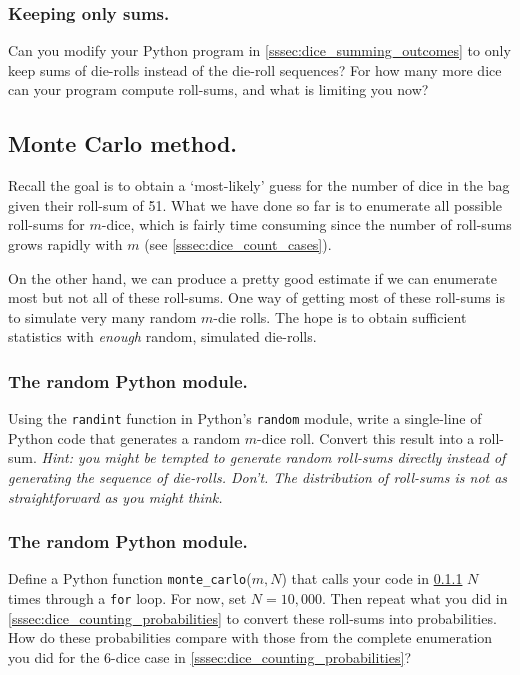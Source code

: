 \documentclass[11pt, oneside]{article}   	%
\begin{document}
\subsubsection{Keeping only sums.} \label{sssec:dice_keeping_only_sums}
Can you modify your Python program in \ref{sssec:dice_summing_outcomes} to only keep sums of die-rolls instead of the die-roll sequences? For how many more dice can your program compute roll-sums, and what is limiting you now? 


\subsection{Monte Carlo method.}
Recall the goal is to obtain a `most-likely' guess for the number of dice in the bag given their roll-sum of 51. What we have done so far is to enumerate all possible roll-sums for $m$-dice, which is fairly time consuming since the number of roll-sums grows rapidly with $m$ (see \ref{sssec:dice_count_cases}). 

On the other hand, we can produce a pretty good estimate if we can enumerate most but not all of these roll-sums. One way of getting most of these roll-sums is to simulate very many random $m$-die rolls. The hope is to obtain sufficient statistics with {\it enough} random, simulated die-rolls. 

\subsubsection{The random Python module.}\label{sssec:dice_montecarlo_randint}
Using the {\tt randint} function in Python's {\tt random} module, write a single-line of Python code that generates a random $m$-dice roll. Convert this result into a roll-sum. {\it Hint: you might be tempted to generate random roll-sums directly instead of generating the sequence of die-rolls. Don't. The distribution of roll-sums is not as straightforward as you might think.}

\subsubsection{The random Python module.}\label{sssec:dice_montecarlo_prob}
Define a Python function {\tt monte\_carlo}($m, N$) that calls your code in \ref{sssec:dice_montecarlo_randint} $N$ times through a {\tt for} loop. For now, set $N=10,000$. Then repeat what you did in \ref{sssec:dice_counting_probabilities} to convert these roll-sums into probabilities. How do these probabilities compare with those from the complete enumeration you did for the 6-dice case in \ref{sssec:dice_counting_probabilities}?
\end{document}

